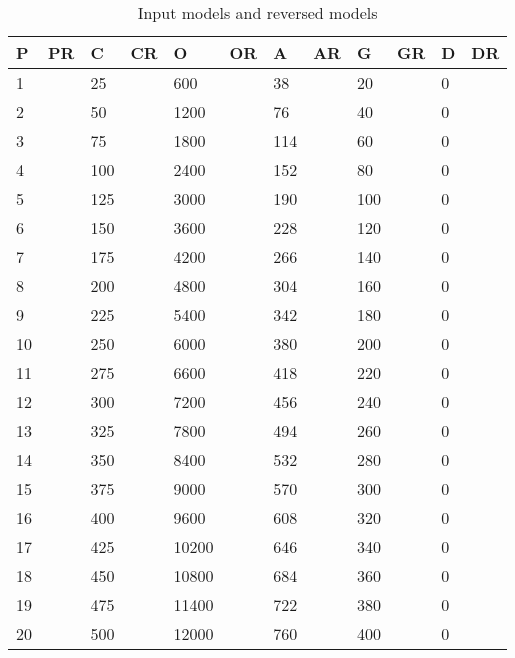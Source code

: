 \begin{table*}[]
\centering
\caption{Input models and reversed models}
\label{table:law1result}
\begin{tabular}{|l|l|l|l|l|l|l|l|l|l|l|l|}
\hline
P  & PR & C    & CR & O     & OR & A    & AR & G   & GR & D & DR \\ \hline
1  &    & 25   &    & 600   &    & 38   &    & 20  &    & 0 &    \\ \hline
2  &    & 50   &    & 1200  &    & 76   &    & 40  &    & 0 &    \\ \hline
3  &    & 75   &    & 1800  &    & 114  &    & 60  &    & 0 &    \\ \hline
4  &    & 100  &    & 2400  &    & 152  &    & 80  &    & 0 &    \\ \hline
5  &    & 125  &    & 3000  &    & 190  &    & 100 &    & 0 &    \\ \hline
6  &    & 150  &    & 3600  &    & 228  &    & 120 &    & 0 &    \\ \hline
7  &    & 175  &    & 4200  &    & 266  &    & 140 &    & 0 &    \\ \hline
8  &    & 200  &    & 4800  &    & 304  &    & 160 &    & 0 &    \\ \hline
9  &    & 225  &    & 5400  &    & 342  &    & 180 &    & 0 &    \\ \hline
10 &    & 250  &    & 6000  &    & 380  &    & 200 &    & 0 &    \\ \hline
11 &    & 275  &    & 6600  &    & 418  &    & 220 &    & 0 &    \\ \hline
12 &    & 300  &    & 7200  &    & 456  &    & 240 &    & 0 &    \\ \hline
13 &    & 325  &    & 7800  &    & 494  &    & 260 &    & 0 &    \\ \hline
14 &    & 350  &    & 8400  &    & 532  &    & 280 &    & 0 &    \\ \hline
15 &    & 375  &    & 9000  &    & 570  &    & 300 &    & 0 &    \\ \hline
16 &    & 400  &    & 9600  &    & 608  &    & 320 &    & 0 &    \\ \hline
17 &    & 425  &    & 10200 &    & 646  &    & 340 &    & 0 &    \\ \hline
18 &    & 450  &    & 10800 &    & 684  &    & 360 &    & 0 &    \\ \hline
19 &    & 475  &    & 11400 &    & 722  &    & 380 &    & 0 &    \\ \hline
20 &    & 500  &    & 12000 &    & 760  &    & 400 &    & 0 &    \\ \hline

\end{tabular}
\end{table*}
